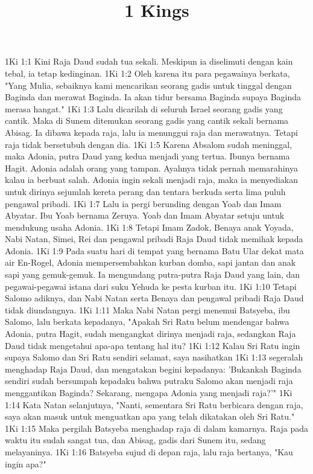 

\title{1 Kings}

1Ki 1:1  Kini Raja Daud sudah tua sekali. Meskipun ia diselimuti dengan kain tebal, ia tetap kedinginan.
1Ki 1:2  Oleh karena itu para pegawainya berkata, "Yang Mulia, sebaiknya kami mencarikan seorang gadis untuk tinggal dengan Baginda dan merawat Baginda. Ia akan tidur bersama Baginda supaya Baginda merasa hangat."
1Ki 1:3  Lalu dicarilah di seluruh Israel seorang gadis yang cantik. Maka di Sunem ditemukan seorang gadis yang cantik sekali bernama Abisag. Ia dibawa kepada raja, lalu ia menunggui raja dan merawatnya. Tetapi raja tidak bersetubuh dengan dia.
1Ki 1:5  Karena Absalom sudah meninggal, maka Adonia, putra Daud yang kedua menjadi yang tertua. Ibunya bernama Hagit. Adonia adalah orang yang tampan. Ayahnya tidak pernah memarahinya kalau ia berbuat salah. Adonia ingin sekali menjadi raja, maka ia menyediakan untuk dirinya sejumlah kereta perang dan tentara berkuda serta lima puluh pengawal pribadi.
1Ki 1:7  Lalu ia pergi berunding dengan Yoab dan Imam Abyatar. Ibu Yoab bernama Zeruya. Yoab dan Imam Abyatar setuju untuk mendukung usaha Adonia.
1Ki 1:8  Tetapi Imam Zadok, Benaya anak Yoyada, Nabi Natan, Simei, Rei dan pengawal pribadi Raja Daud tidak memihak kepada Adonia.
1Ki 1:9  Pada suatu hari di tempat yang bernama Batu Ular dekat mata air En-Rogel, Adonia mempersembahkan kurban domba, sapi jantan dan anak sapi yang gemuk-gemuk. Ia mengundang putra-putra Raja Daud yang lain, dan pegawai-pegawai istana dari suku Yehuda ke pesta kurban itu.
1Ki 1:10  Tetapi Salomo adiknya, dan Nabi Natan serta Benaya dan pengawal pribadi Raja Daud tidak diundangnya.
1Ki 1:11  Maka Nabi Natan pergi menemui Batsyeba, ibu Salomo, lalu berkata kepadanya, "Apakah Sri Ratu belum mendengar bahwa Adonia, putra Hagit, sudah mengangkat dirinya menjadi raja, sedangkan Raja Daud tidak mengetahui apa-apa tentang hal itu?
1Ki 1:12  Kalau Sri Ratu ingin supaya Salomo dan Sri Ratu sendiri selamat, saya nasihatkan
1Ki 1:13  segeralah menghadap Raja Daud, dan mengatakan begini kepadanya: 'Bukankah Baginda sendiri sudah bersumpah kepadaku bahwa putraku Salomo akan menjadi raja menggantikan Baginda? Sekarang, mengapa Adonia yang menjadi raja?'"
1Ki 1:14  Kata Natan selanjutnya, "Nanti, sementara Sri Ratu berbicara dengan raja, saya akan masuk untuk menguatkan apa yang telah dikatakan oleh Sri Ratu."
1Ki 1:15  Maka pergilah Batsyeba menghadap raja di dalam kamarnya. Raja pada waktu itu sudah sangat tua, dan Abisag, gadis dari Sunem itu, sedang melayaninya.
1Ki 1:16  Batsyeba sujud di depan raja, lalu raja bertanya, "Kau ingin apa?"
